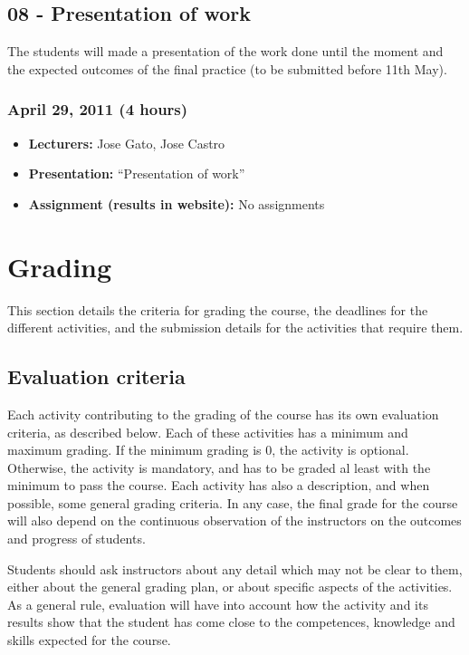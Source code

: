 \documentclass[a4paper]{article}
\begin{document}
\subsection{08 - Presentation of work}

The students will made a presentation of the work done until the moment and the expected outcomes of the final practice (to be submitted before 11th May).

\subsubsection{April 29, 2011 (4 hours)}

\begin{itemize}
\item \textbf{Lecturers:} Jose Gato, Jose Castro
\item \textbf{Presentation:} ``Presentation of work''
\item \textbf{Assignment (results in website):} No assignments
\end{itemize}





\section{Grading}

This section details the criteria for grading the course, the
deadlines for the different activities, and the submission details for
the activities that require them.

\subsection{Evaluation criteria}
\label{sub:evaluation-criteria}

Each activity contributing to the grading of the course has its own
evaluation criteria, as described below. Each of these activities has
a minimum and maximum grading. If the minimum grading is 0, the
activity is optional. Otherwise, the activity is mandatory, and has to
be graded al least with the minimum to pass the course. Each activity
has also a description, and when possible, some general grading
criteria. In any case, the final grade for the course will also depend
on the continuous observation of the instructors on the outcomes and
progress of students.

Students should ask instructors about any detail which may not be
clear to them, either about the general grading plan, or about
specific aspects of the activities. As a general rule, evaluation will
have into account how the activity and its results show that the
student has come close to the competences, knowledge and skills
expected for the course.
\end{document}
